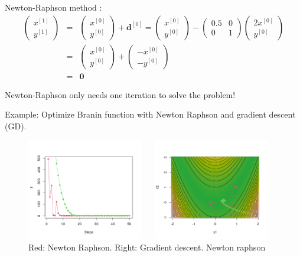 \documentclass[11pt,compress,t,notes=noshow, xcolor=table]{beamer}
\begin{document}
\begin{vbframe}{Newton-Raphson method}
:
\begin{eqnarray*}
\begin{pmatrix}
x^{[1]} \\
y^{[1]}
\end{pmatrix} &=& \begin{pmatrix}
x^{[0]} \\
y^{[0]}
\end{pmatrix} + \mathbf{d}^{[0]} = \begin{pmatrix}
x^{[0]} \\
y^{[0]}
\end{pmatrix} - \begin{pmatrix}
0.5 &  0 \\
0 & 1
\end{pmatrix} \begin{pmatrix}
2x^{[0]} \\
y^{[0]}
\end{pmatrix} \\
&=& \begin{pmatrix}
x^{[0]} \\
y^{[0]}
\end{pmatrix} + \begin{pmatrix}
-x^{[0]} \\
-y^{[0]}
\end{pmatrix} \\
&=& \mathbf{0}
\end{eqnarray*}

Newton-Raphson only needs one iteration to solve the problem!

\framebreak 

Example: Optimize Branin function with Newton Raphson and gradient descent (GD). 

\begin{figure}
    \centering
    \includegraphics[width=0.45\textwidth]{slides/05-multivariate-second-order/figure_man/NR_1.png} ~~ \includegraphics[width=0.45\textwidth]{slides/05-multivariate-second-order/figure_man/NR_2.png} \\
    Red: Newton Raphson. Right: Gradient descent. Newton raphson 
\end{figure}


\end{vbframe}
\end{document}
